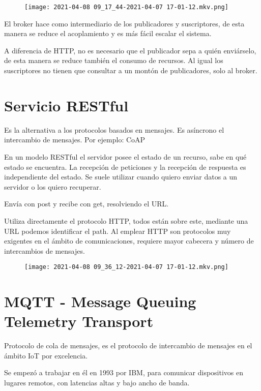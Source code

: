 \documentclass[12pt, twoside, openright]{report} %
\begin{document}
\begin{figure}[H]
	{\texttt{[image: 2021-04-08 09\_17\_44-2021-04-07 17-01-12.mkv.png]}
	\def\svgwidth{.6\textwidth}
     }
\end{figure}

El broker hace como intermediario de los publicadores y suscriptores, de esta manera se reduce el acoplamiento y es más fácil escalar el sistema.

A diferencia de HTTP, no es necesario que el publicador sepa a quién enviárselo, de esta manera se reduce también el consumo de recursos. Al igual los suscriptores no tienen que consultar a un montón de publicadores, solo al broker.

\section{Servicio RESTful}

Es la alternativa a los protocolos basados en mensajes. Es asíncrono el intercambio de mensajes. Por ejemplo: CoAP

En un modelo RESTful el servidor posee el estado de un recurso, sabe en qué estado se encuentra.
La recepción de peticiones y la recepción de respuesta es independiente del estado. Se suele utilizar cuando quiero enviar datos a un servidor o los quiero recuperar.

Envía con post y recibe con get, resolviendo el URL.

Utiliza directamente el protocolo HTTP, todos están sobre este, mediante una URL podemos identificar el path.
Al emplear HTTP son protocolos muy exigentes en el ámbito de comunicaciones, requiere mayor cabecera y número de intercambios de mensajes.
\vspace{-1.5cm}
\begin{figure}[H]
	{\texttt{[image: 2021-04-08 09\_36\_12-2021-04-07 17-01-12.mkv.png]}}
\end{figure}

\section{MQTT - Message Queuing Telemetry Transport}
Protocolo de cola de mensajes, es el protocolo de intercambio de mensajes en el ámbito IoT por excelencia.

Se empezó a trabajar en él en 1993 por IBM, para comunicar dispositivos en lugares remotos, con latencias altas y bajo ancho de banda.
\end{document}
